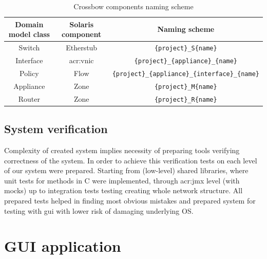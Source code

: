 \documentclass[11pt,openany]{book}
\begin{document}
        \begin{table}[H]
          \centering

          \begin{tabular}{|c|c|c|}
            \hline
            Domain model class & Solaris component & Naming scheme                                                \\
            \hline \hline
            Switch             & Etherstub         & \texttt{\{project\}\_S\{name\}}                              \\
            \hline
            Interface          & \gls{acr:vnic}    & \texttt{\{project\}\_\{appliance\}\_\{name\}}                \\
            \hline
            Policy             & Flow              & \texttt{\{project\}\_\{appliance\}\_\{interface\}\_\{name\}} \\
            \hline
            Appliance          & Zone              & \texttt{\{project\}\_M\{name\}}                              \\
            \hline
            Router             & Zone              & \texttt{\{project\}\_R\{name\}}                              \\
            \hline
          \end{tabular}

          \caption{Crossbow components naming scheme}
          \label{tab:impl:naming}
        \end{table}
		

      \subsection{System verification}
      \label{sec:impl:verif}
		
        Complexity of created system implies necessity of preparing tools verifying correctness of the system. In order
        to achieve this verification tests on each level of our system were prepared. Starting from (low-level) shared
        libraries, where unit tests for methods in C were implemented, through \gls{acr:jmx} level (with mocks) up to
        integration tests testing creating whole network structure. All prepared tests helped in finding most obvious
        mistakes and prepared system for testing with gui with lower risk of damaging underlying OS.  

      \section{GUI application}
      \label{sec:impl:gui}
		
\end{document}

